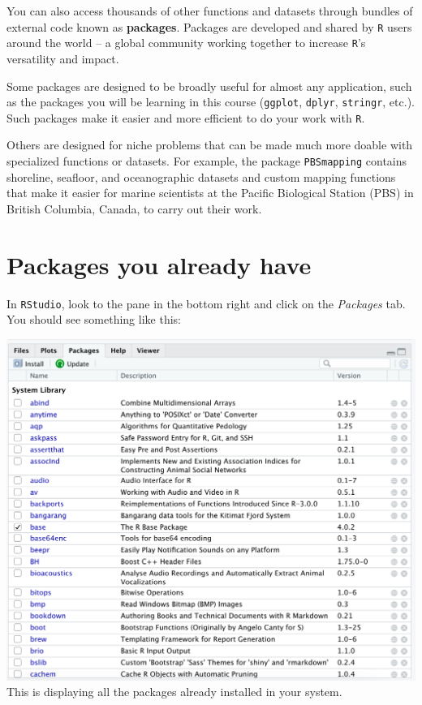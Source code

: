 \documentclass[
]{book}
\begin{document}
You can also access thousands of other functions and datasets through bundles of external code known as \textbf{packages}. Packages are developed and shared by \texttt{R} users around the world -- a global community working together to increase \texttt{R}'s versatility and impact.

Some packages are designed to be broadly useful for almost any application, such as the packages you will be learning in this course (\texttt{ggplot}, \texttt{dplyr}, \texttt{stringr}, etc.). Such packages make it easier and more efficient to do your work with \texttt{R}.

Others are designed for niche problems that can be made much more doable with specialized functions or datasets. For example, the package \texttt{PBSmapping} contains shoreline, seafloor, and oceanographic datasets and custom mapping functions that make it easier for marine scientists at the Pacific Biological Station (PBS) in British Columbia, Canada, to carry out their work.

\hypertarget{packages-you-already-have}{%
\section*{Packages you already have}\label{packages-you-already-have}}

In \texttt{RStudio}, look to the pane in the bottom right and click on the \emph{Packages} tab. You should see something like this:

\includegraphics{img/rstudio_packages.png}
This is displaying all the packages already installed in your system.
\end{document}
